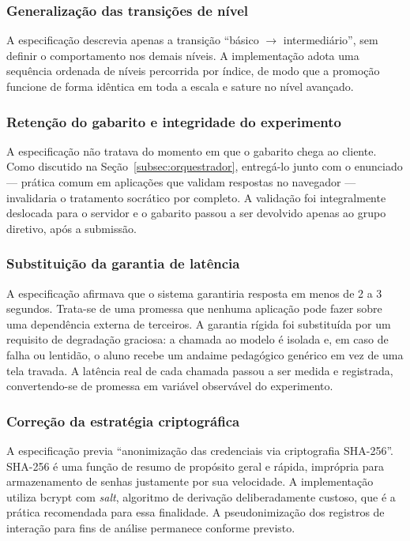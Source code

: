 \documentclass[10pt, a4paper, twocolumn]{article}
\begin{document}
\subsubsection{Generalização das transições de nível}

A especificação descrevia apenas a transição ``básico $\rightarrow$
intermediário'', sem definir o comportamento nos demais níveis. A implementação
adota uma sequência ordenada de níveis percorrida por índice, de modo que a
promoção funcione de forma idêntica em toda a escala e sature no nível avançado.

\subsubsection{Retenção do gabarito e integridade do experimento}

A especificação não tratava do momento em que o gabarito chega ao cliente. Como
discutido na Seção~\ref{subsec:orquestrador}, entregá-lo junto com o enunciado
--- prática comum em aplicações que validam respostas no navegador ---
invalidaria o tratamento socrático por completo. A validação foi integralmente
deslocada para o servidor e o gabarito passou a ser devolvido apenas ao grupo
diretivo, após a submissão.

\subsubsection{Substituição da garantia de latência}

A especificação afirmava que o sistema garantiria resposta em menos de 2 a 3
segundos. Trata-se de uma promessa que nenhuma aplicação pode fazer sobre uma
dependência externa de terceiros. A garantia rígida foi substituída por um
requisito de degradação graciosa: a chamada ao modelo é isolada e, em caso de
falha ou lentidão, o aluno recebe um andaime pedagógico genérico em vez de uma
tela travada. A latência real de cada chamada passou a ser medida e registrada,
convertendo-se de promessa em variável observável do experimento.

\subsubsection{Correção da estratégia criptográfica}

A especificação previa ``anonimização das credenciais via criptografia
SHA-256''. SHA-256 é uma função de resumo de propósito geral e rápida, imprópria
para armazenamento de senhas justamente por sua velocidade. A implementação
utiliza bcrypt com \textit{salt}, algoritmo de derivação deliberadamente custoso,
que é a prática recomendada para essa finalidade. A pseudonimização dos registros
de interação para fins de análise permanece conforme previsto.
\end{document}
